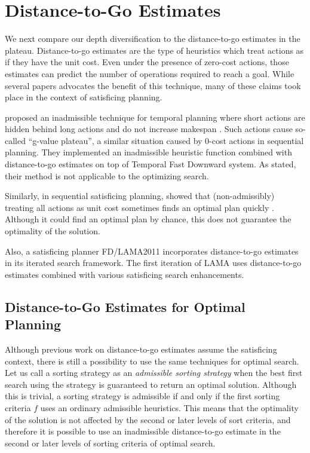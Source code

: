 \clearpage
\section{Distance-to-Go Estimates}

\label{sec:distance-to-go}

We next compare our depth diversification to the distance-to-go
estimates in the plateau.  Distance-to-go estimates are the type of
heuristics which treat actions as if they have the unit cost. Even under
the presence of zero-cost actions, those estimates can predict the
number of operations required to reach a goal.
While several papers advocates the benefit of this technique, many of
these claims took place in the context of satisficing planning.

 proposed an inadmissible technique for temporal
planning where short actions are hidden behind long actions and do not
increase makespan \cite{benton2010g}. Such actions cause so-called
``g-value plateau'', a similar situation caused by 0-cost actions in
sequential planning.  They implemented an inadmissible heuristic
function combined with distance-to-go estimates on top of
Temporal Fast Downward system.  As stated, their method is not
applicable to the optimizing search.
 
Similarly, in sequential satisficing planning,
 showed that
(non-admissibly) treating all actions as unit cost sometimes finds an
optimal plan quickly \cite{cushing2010cost}.
Although it could find an optimal plan by chance, this does not
guarantee the optimality of the solution.
 
Also, a \sota satisficing planner FD/LAMA2011 incorporates
distance-to-go estimates in its iterated search framework. The first
iteration of LAMA uses distance-to-go estimates combined with various
satisficing search enhancements.

\subsection{Distance-to-Go Estimates for Optimal Planning}

Although previous work on distance-to-go estimates assume the
satisficing context,
there is still a possibility to use the same techniques for optimal search.
Let us call a sorting strategy as an \emph{admissible sorting strategy}
when the best first search using the strategy is guaranteed to return an
optimal solution. Although this
is trivial, a sorting strategy is admissible if and only if the 
first sorting criteria $f$ uses an ordinary
admissible heuristics. 
This means that the optimality of the solution is not affected by the
second or later levels of sort criteria, and therefore
it is possible to use an inadmissible
distance-to-go estimate in the second or later levels of sorting criteria of optimal search.
 
